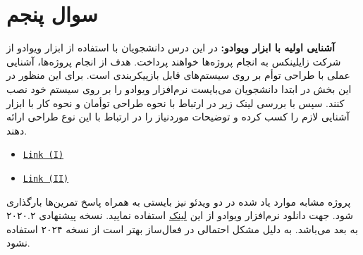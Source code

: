 \section{سوال پنجم}
\textbf{آشنایی اولیه با ابزار ویوادو:} در این درس دانشجویان با استفاده از ابزار ویوادو از شرکت زایلینکس به انجام پروژه‌ها خواهند پرداخت. هدف از انجام پروژه‌ها، آشنایی عملی با طراحی توأم بر روی سیستم‌های قابل بازپیکربندی است. برای این منظور در این بخش در ابتدا دانشجویان می‌بایست نرم‌افزار ویوادو را بر روی سیستم خود نصب کنند. سپس با بررسی لینک زیر در ارتباط با نحوه طراحی توأمان و نحوه کار با ابزار آشنایی لازم را کسب کرده و توضیحات موردنیاز را در ارتباط با این نوع طراحی ارائه دهند.

\begin{latin}
	\begin{itemize}
		\item 
		\texttt{\textcolor{magenta}{\href{https://www.youtube.com/watch?v=_odNhKOZjEo}{Link (I)}}}
		
		\item 
		\texttt{\textcolor{magenta}{\href{https://www.youtube.com/watch?v=AOy5l36DroY&t=0s}{Link (II)}}}
	\end{itemize}
\end{latin}

پروژه مشابه موارد یاد شده در دو ویدئو نیز بایستی به همراه پاسخ تمرین‌ها بارگذاری شود. جهت دانلود نرم‌افزار ویوادو از این 
\href{https://downloadly.ir/software/engineering-specialized/xilinx-vivado-design-suite/}{لینک}
استفاده نمایید. نسخه پیشنهادی ۲۰۲۰.۲ به بعد می‌باشد. به دلیل مشکل احتمالی در فعال‌ساز بهتر است از نسخه ۲۰۲۴ استفاده نشود.